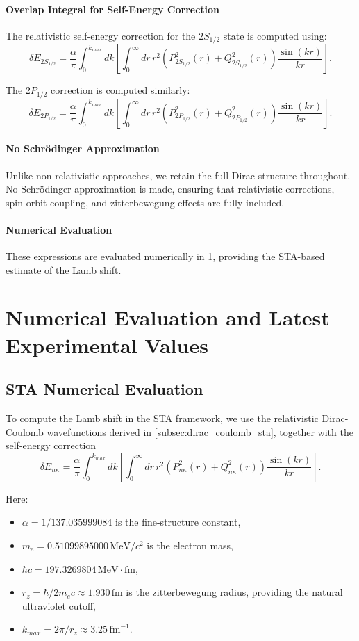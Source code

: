 \documentclass[12pt]{article}
\begin{document}
\paragraph{Overlap Integral for Self-Energy Correction}
The relativistic self-energy correction for the \(2S_{1/2}\) state is computed using:
\[
\delta E_{2S_{1/2}} = \frac{\alpha}{\pi}\int_0^{k_{max}} dk\left[\int_0^\infty dr\,r^2\left(P_{2S_{1/2}}^2(r)+Q_{2S_{1/2}}^2(r)\right)\frac{\sin(kr)}{kr}\right].
\]

The \(2P_{1/2}\) correction is computed similarly:
\[
\delta E_{2P_{1/2}} = \frac{\alpha}{\pi}\int_0^{k_{max}} dk\left[\int_0^\infty dr\,r^2\left(P_{2P_{1/2}}^2(r)+Q_{2P_{1/2}}^2(r)\right)\frac{\sin(kr)}{kr}\right].
\]

\paragraph{No Schrödinger Approximation}
Unlike non-relativistic approaches, we retain the full Dirac structure throughout. No Schrödinger approximation is made, ensuring that relativistic corrections, spin-orbit coupling, and zitterbewegung effects are fully included.

\paragraph{Numerical Evaluation}
These expressions are evaluated numerically in \ref{sec:experimental}, providing the STA-based estimate of the Lamb shift.


\section{Numerical Evaluation and Latest Experimental Values}\label{sec:experimental}

\subsection{STA Numerical Evaluation}\label{subsec:sta_numerical}

To compute the Lamb shift in the STA framework, we use the relativistic Dirac-Coulomb wavefunctions derived in \ref{subsec:dirac_coulomb_sta}, together with the self-energy correction
\[
\delta E_{n\kappa} = \frac{\alpha}{\pi}\int_0^{k_{max}} dk\left[\int_0^\infty dr\,r^2\left(P_{n\kappa}^2(r)+Q_{n\kappa}^2(r)\right)\frac{\sin(kr)}{kr}\right].
\]

Here:
\begin{itemize}
    \item \(\alpha = 1/137.035999084\) is the fine-structure constant,
    \item \(m_e = 0.51099895000\,\mathrm{MeV}/c^2\) is the electron mass,
    \item \(\hbar c = 197.3269804\,\mathrm{MeV}\cdot\mathrm{fm}\),
    \item \(r_z = \hbar/2m_e c \approx 1.930\,\mathrm{fm}\) is the zitterbewegung radius, providing the natural ultraviolet cutoff,
    \item \(k_{max} = 2\pi/r_z \approx 3.25\,\mathrm{fm}^{-1}\).
\end{itemize}
\end{document}

